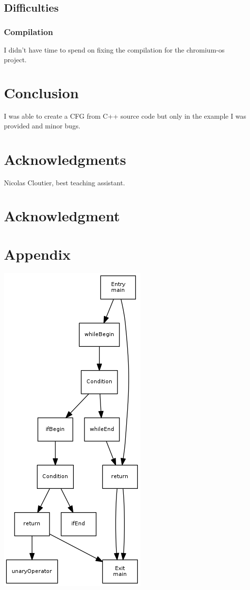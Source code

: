 \documentclass[conference,compsoc]{IEEEtran}
\begin{document}
\subsection{Difficulties}

\subsubsection{Compilation}

I didn't have time to spend on fixing the compilation for the chromium-os project.

\section{Conclusion}

I was able to create a CFG from C++ source code but only in
 the example I was provided and minor bugs.



\ifCLASSOPTIONcompsoc
  \section*{Acknowledgments}
    Nicolas Cloutier, best teaching assistant.
\else
  \section*{Acknowledgment}
\fi

\section{Appendix}

\includegraphics{cfg}
\end{document}
